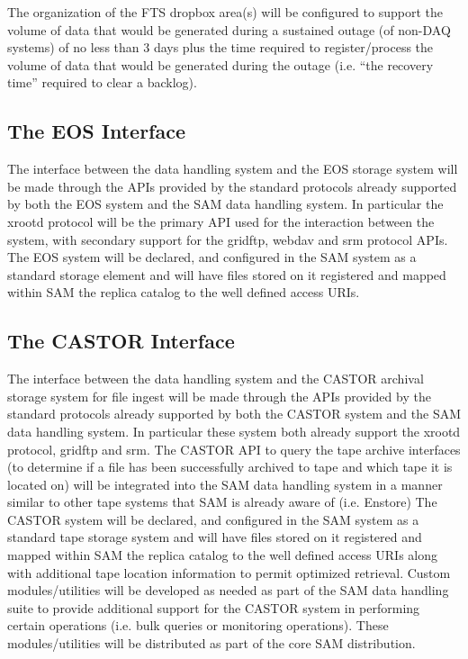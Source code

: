 \documentclass[pdftex,12pt,letter]{article}
\begin{document}
The organization of the FTS dropbox area(s) will be configured to support the volume of data that would be generated during a
sustained outage (of non-DAQ systems) of no less than 3 days plus the time required to register/process the volume of data
that would be generated during the outage (i.e. ``the recovery time'' required to clear a backlog).

\subsection{The EOS Interface}
The interface between the data handling system and the EOS storage system will be made through the APIs
provided by the standard protocols already supported by both the EOS system and the SAM data handling system.
In particular the xrootd protocol will be the primary API used for the interaction between the system, with secondary
support for the gridftp, webdav and srm protocol APIs.  The EOS system will be declared, and configured in the SAM
system as a standard storage element and will have files stored on it registered and mapped within SAM the replica
catalog to the well defined access URIs. 

\subsection{The CASTOR Interface}
The interface between the data handling system and the CASTOR archival storage system for file ingest will be made through the
APIs provided by the standard protocols already supported by both the CASTOR system and the SAM data handling system.
In particular these system both already support the xrootd protocol, gridftp and srm.  The CASTOR API to query the tape archive
interfaces (to determine if a file has been successfully archived to tape and which tape it is located on) will be integrated into the
SAM data handling system in a manner similar to other tape systems that SAM is already aware of (i.e. Enstore)   The CASTOR
system will be declared, and configured in the SAM system as a standard tape storage system and will have files stored on it
registered and mapped within SAM the replica catalog to the well defined access URIs along with additional tape location information
to permit optimized retrieval.  Custom modules/utilities will be developed as needed as part of the SAM data handling suite to provide
additional support for the CASTOR system in performing certain operations (i.e. bulk queries or monitoring operations).
These modules/utilities will be distributed as part of the core SAM distribution.
\end{document}

